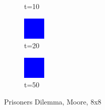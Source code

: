 \documentclass[a4paper, 11pt]{article}
\begin{document}
\begin{landscape}
\begin{figure}[H]
\begin{subfigure}{.26\textwidth}
  \caption{t=10}
\end{subfigure}%
\begin{subfigure}{.26\textwidth}
  \centering
  \includegraphics[width=0.9\linewidth]{PRISONERS_DILEMMA_MOORE_8x8_t20}
  \caption{t=20}
\end{subfigure}%
\begin{subfigure}{.26\textwidth}
  \centering
  \includegraphics[width=0.9\linewidth]{PRISONERS_DILEMMA_MOORE_8x8_t50}
  \caption{t=50}
\end{subfigure}
\caption{Prisoners Dilemma, Moore, 8x8}
\end{figure}



\end{landscape}
\end{document}
